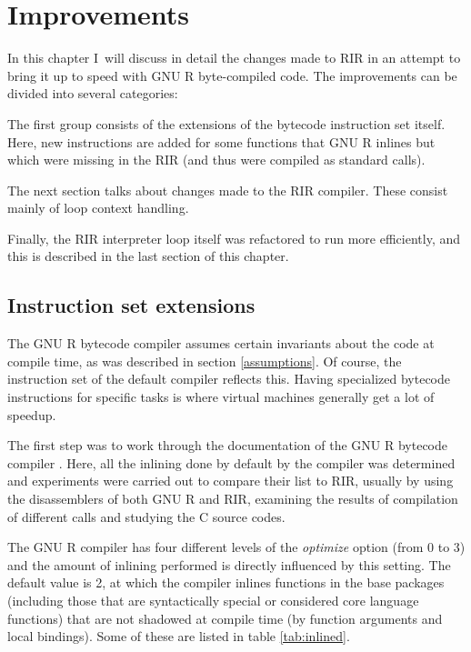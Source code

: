 \chapter{Improvements\label{improvements}}

In this chapter I~will discuss in detail the changes made to RIR in an attempt to bring it up to speed with GNU R byte-compiled code. The improvements can be divided into several categories:

The first group consists of the extensions of the bytecode instruction set itself. Here, new instructions are added for some functions that GNU R inlines but which were missing in the RIR (and thus were compiled as standard calls).

The next section talks about changes made to the RIR compiler. These consist mainly of loop context handling.

Finally, the RIR interpreter loop itself was refactored to run more efficiently, and this is described in the last section of this chapter.


\section{Instruction set extensions}

The GNU R bytecode compiler assumes certain invariants about the code at compile time, as was described in section \ref{assumptions}. Of course, the instruction set of the default compiler reflects this. Having specialized bytecode instructions for specific tasks is where virtual machines generally get a lot of speedup.

The first step was to work through the documentation of the GNU R bytecode compiler \autocite{compiler}. Here, all the inlining done by default by the compiler was determined and experiments were carried out to compare their list to RIR, usually by using the disassemblers of both GNU R and RIR, examining the results of compilation of different calls and studying the C source codes.

The GNU R compiler has four different levels of the \emph{optimize} option (from 0 to 3) and the amount of inlining performed is directly influenced by this setting. The default value is 2, at which the compiler inlines functions in the base packages (including those that are syntactically special or considered core language functions) that are not shadowed at compile time (by function arguments and local bindings). Some of these are listed in table \ref{tab:inlined}.

